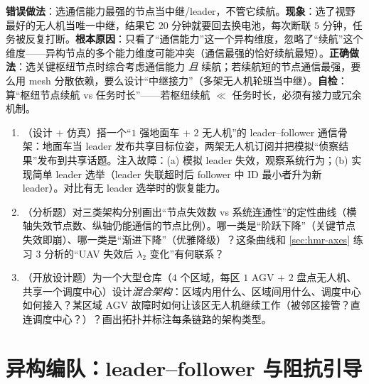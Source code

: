 \begin{pitfall}
\textbf{错误做法}：选通信能力最强的节点当中继/leader，不管它续航。\textbf{现象}：选了视野最好的无人机当唯一中继，结果它 $20$ 分钟就要回去换电池，每次断联 $5$ 分钟，任务被反复打断。\textbf{根本原因}：只看了“通信能力”这一个异构维度，忽略了“续航”这个维度——异构节点的多个能力维度可能冲突（通信最强的恰好续航最短）。\textbf{正确做法}：选关键枢纽节点时综合考虑通信能力 \emph{且} 续航；若续航短的节点通信最强，要么用 mesh 分散依赖，要么设计“中继接力”（多架无人机轮班当中继）。\textbf{自检}：算“枢纽节点续航 vs 任务时长”——若枢纽续航 $\ll$ 任务时长，必须有接力或冗余机制。
\end{pitfall}

\begin{practice}
\begin{enumerate}
  \item （设计 $+$ 仿真）搭一个“$1$ 强地面车 $+$ $2$ 无人机”的 leader--follower 通信骨架：地面车当 leader 发布共享目标位姿，两架无人机订阅并把模拟“侦察结果”发布到共享话题。注入故障：(a) 模拟 leader 失效，观察系统行为；(b) 实现简单 leader 选举（leader 失联超时后 follower 中 ID 最小者升为新 leader）。对比有无 leader 选举时的恢复能力。
  \item （分析题）对三类架构分别画出“节点失效数 vs 系统连通性”的定性曲线（横轴失效节点数、纵轴仍能通信的节点比例）。哪一类是“阶跃下降”（关键节点失效即崩）、哪一类是“渐进下降”（优雅降级）？这条曲线和 \cref{sec:hmr-axes} 练习 3 分析的“UAV 失效后 $\lambda_2$ 变化”有何联系？
  \item （开放设计题）为一个大型仓库（$4$ 个区域，每区 $1$ AGV $+$ $2$ 盘点无人机、共享一个调度中心）设计\emph{混合架构}：区域内用什么、区域间用什么、调度中心如何接入？某区域 AGV 故障时如何让该区无人机继续工作（被邻区接管？直连调度中心？）？画出拓扑并标注每条链路的架构类型。
\end{enumerate}
\end{practice}

\section{异构编队：leader--follower 与阻抗引导}
\label{sec:hmr-formation}

